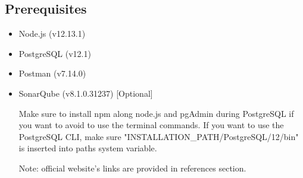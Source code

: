 \subsection{Prerequisites}
\begin{itemize}
	\item Node.js (v12.13.1)
	\item PostgreSQL (v12.1)
	\item Postman (v7.14.0)
	\item SonarQube (v8.1.0.31237)	[Optional]
	
	Make sure to install npm along node.js and pgAdmin during PostgreSQL if you want to avoid to use the terminal commands. If you want to use the PostgreSQL CLI, make sure "INSTALLATION\_PATH/PostgreSQL/12/bin" is inserted into paths system variable.
	
	Note: official website's links are provided in references section.
\end{itemize}


